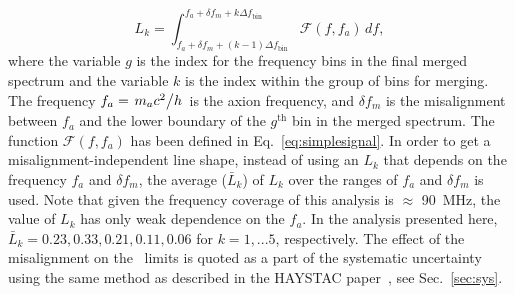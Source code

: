 \begin{equation}
  \label{eq:Lq_integral}
  L_{k} = \int_{f_a +\delta f_m + (k-1)\Delta f_\text{bin}}^{f_a +\delta f_m + k\Delta f_\text{bin}} \mathcal{F}(f,f_a) \,df,
\end{equation}
where the variable $g$ is the index for the frequency bins in 
the final merged spectrum and the variable 
$k$ is the index within the group of bins for 
merging. The frequency $f_a=\left.m_a c^2\middle/h\right.$ is the axion
frequency, and $\delta f_m$ is the misalignment between $f_a$ and the lower
boundary of the $g^\text{th}$ bin in the merged spectrum.
The function $\mathcal{F}(f,f_a)$ has been defined in 
Eq.~\eqref{eq:simplesignal}.
In order to get a misalignment-independent line shape, instead of using an
$L_{k}$ that depends on the frequency $f_a$ and  $\delta f_m$, the average 
($\bar{L}_{k}$) of $L_{k}$ over the ranges of $f_a$ and $\delta f_m$ is 
used. 
Note that given the frequency coverage of this analysis is $\approx$ 90~MHz, 
the value of $L_{k}$ has only weak dependence on the $f_a$. 
In the analysis presented here, 
$\bar{L}_{k} = 0.23, 0.33, 0.21, 0.11, 0.06$ for $k = 1, ... 5$, respectively.
The effect of the misalignment on the \gagg\ limits is quoted as a part of 
the systematic uncertainty using the same method as described in the HAYSTAC 
paper~\cite{HAYSTACII}, see Sec.~\ref{sec:sys}.

